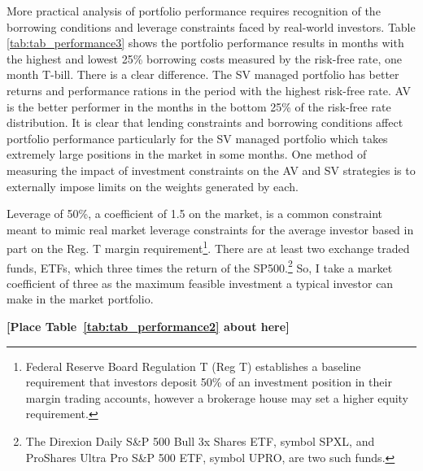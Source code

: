 More practical analysis of portfolio performance requires recognition of the borrowing conditions and leverage constraints faced by real-world investors. Table \ref{tab:tab_performance3} shows the portfolio performance results in months with the highest and lowest 25\% borrowing costs measured by the risk-free rate, one month T-bill. There is a clear difference. The SV managed portfolio has better returns and performance rations in the period with the highest risk-free rate. AV is the better performer in the months in the bottom 25\% of the risk-free rate distribution. It is clear that lending constraints and borrowing conditions affect portfolio performance particularly for the SV managed portfolio which takes extremely large positions in the market in some months. One method of measuring the impact of investment constraints on the AV and SV strategies is to externally impose limits on the weights generated by each.

Leverage of 50\%, a coefficient of 1.5 on the market, is a common constraint meant to mimic real market leverage constraints for the average investor based in part on the Reg. T margin requirement\footnote{Federal Reserve Board Regulation T (Reg T) establishes a baseline requirement that investors deposit 50\% of an investment position in their margin trading accounts, however a brokerage house may set a higher equity requirement.}. \citep{Campbell2008,Rapach2010,Rapach2013,Huang2015,Rapach2016,moreira_volatility-managed_2017,deuskar_margin_2017} There are at least two exchange traded funds, ETFs, which three times the return of the SP500.\footnote{The Direxion Daily S\&P 500 Bull 3x Shares ETF, symbol SPXL, and ProShares Ultra Pro S\&P 500 ETF, symbol UPRO, are two such funds.} So, I take a market coefficient of three as the maximum feasible investment a typical investor can make in the market portfolio. 
\bigskip
\centerline{\bf [Place Table~\ref{tab:tab_performance2} about here]}
\bigskip

